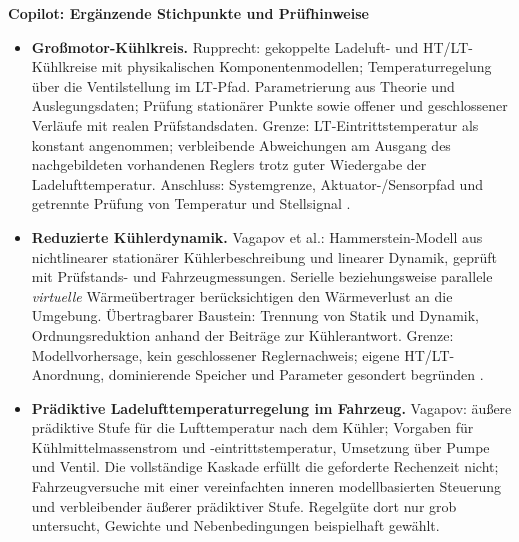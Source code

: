 


\par\smallskip
\noindent\textbf{Copilot: Ergänzende Stichpunkte und Prüfhinweise}
\par\smallskip
\begin{itemize}
  \item \textbf{Großmotor-Kühlkreis.}
    Rupprecht: gekoppelte Ladeluft- und HT/LT-Kühlkreise mit
    physikalischen Komponentenmodellen; Temperaturregelung über
    die Ventilstellung im LT-Pfad.
    Parametrierung aus Theorie und Auslegungsdaten; Prüfung
    stationärer Punkte sowie offener und geschlossener Verläufe
    mit realen Prüfstandsdaten.
    Grenze: LT-Eintrittstemperatur als konstant angenommen;
    verbleibende Abweichungen am Ausgang des nachgebildeten
    vorhandenen Reglers trotz guter Wiedergabe der Ladelufttemperatur.
    Anschluss: Systemgrenze, Aktuator-/Sensorpfad und getrennte
    Prüfung von Temperatur und Stellsignal
    \cite[S.~12, 44--47, 96--100 und 138--140]{rupprechtAnalysisSimulationOptimisation2016}.
  \item \textbf{Reduzierte Kühlerdynamik.}
    Vagapov et al.: Hammerstein-Modell aus nichtlinearer
    stationärer Kühlerbeschreibung und linearer Dynamik,
    geprüft mit Prüfstands- und Fahrzeugmessungen.
    Serielle beziehungsweise parallele \emph{virtuelle} Wärmeübertrager
    berücksichtigen den Wärmeverlust an die Umgebung.
    Übertragbarer Baustein: Trennung von Statik und Dynamik,
    Ordnungsreduktion anhand der Beiträge zur Kühlerantwort.
    Grenze: Modellvorhersage, kein geschlossener Reglernachweis;
    eigene HT/LT-Anordnung, dominierende Speicher und Parameter
    gesondert begründen
    \cite[Abschn.~2--5]{vagapovDynamicModelTemperature2022}.
  \item \textbf{Prädiktive Ladelufttemperaturregelung im Fahrzeug.}
    Vagapov: äußere prädiktive Stufe für die Lufttemperatur nach dem
    Kühler; Vorgaben für Kühlmittelmassenstrom und -eintrittstemperatur,
    Umsetzung über Pumpe und Ventil.
    Die vollständige Kaskade erfüllt die geforderte Rechenzeit nicht;
    Fahrzeugversuche mit einer vereinfachten inneren modellbasierten
    Steuerung und verbleibender äußerer prädiktiver Stufe.
    Regelgüte dort nur grob untersucht, Gewichte und Nebenbedingungen
    beispielhaft gewählt.

\end{itemize}
